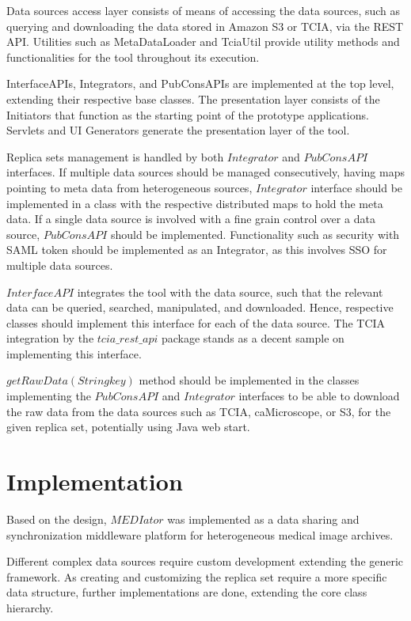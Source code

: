 \documentclass[conference]{IEEEtran}
\begin{document}
Data sources access layer consists of means of accessing the data sources, such as querying and downloading the data stored in Amazon S3 or TCIA, via the REST API. Utilities such as MetaDataLoader and TciaUtil provide utility methods and functionalities for the tool throughout its execution.

InterfaceAPIs, Integrators, and PubConsAPIs are implemented at the top level, extending their respective base classes. The presentation layer consists of the Initiators that function as the starting point of the prototype applications. Servlets and UI Generators generate the presentation layer of the tool.

Replica sets management is handled by both $Integrator$ and $PubConsAPI$ interfaces. If multiple data sources should be managed consecutively, having maps pointing to meta data from heterogeneous sources, $Integrator$ interface should be implemented in a class with the respective distributed maps to hold the meta data. If a single data source is involved with a fine grain control over a data source, $PubConsAPI$ should be implemented. Functionality such as security with SAML token should be implemented as an Integrator, as this involves SSO for multiple data sources.


$InterfaceAPI$ integrates the tool with the data source, such that the relevant data can be queried, searched, manipulated, and downloaded. Hence, respective classes should implement this interface for each of the data source. The TCIA integration by the $tcia\_rest\_api$ package stands as a decent sample on implementing this interface.

$getRawData(String key)$ method should be implemented in the classes implementing the $PubConsAPI$ and $Integrator$ interfaces to be able to download the raw data from the data sources such as TCIA, caMicroscope, or S3, for the given replica set, potentially using Java web start.

\section{Implementation}
Based on the design, $MEDIator$ was implemented as a data sharing and synchronization middleware platform for heterogeneous medical image archives.

Different complex data sources require custom development extending the generic framework. As creating and customizing the replica set require a more specific data structure, further implementations are done, extending the core class hierarchy. %
\end{document}
